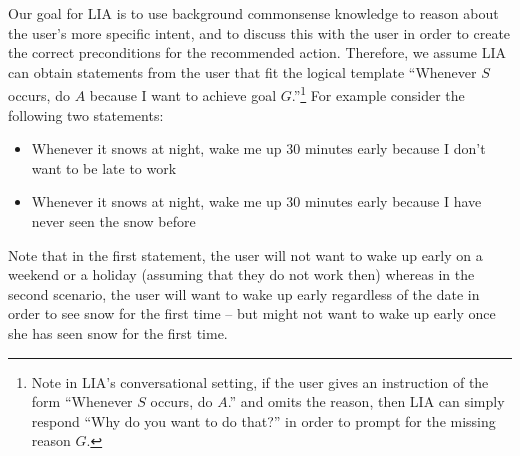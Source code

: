 Our goal for LIA is to use background commonsense knowledge to reason about the user's more specific intent, and to discuss this with the user in order to create the correct preconditions for the recommended action.  Therefore, we assume LIA can obtain statements from the user that fit the logical template ``Whenever $S$ occurs, do $A$ because I want to achieve goal $G$.''\footnote{Note in LIA's conversational setting, if the user gives an instruction of the form ``Whenever $S$ occurs, do $A$.'' and omits the reason, then LIA can simply respond ``Why do you want to do that?'' in order to prompt for the missing reason $G$.}
For example consider the following two statements: %
\begin{itemize}
\item Whenever it snows at night, wake me up 30 minutes early because I don't want to be late to work
\item Whenever it snows at night, wake me up 30 minutes early because I have never seen the snow before 
\end{itemize}
Note that in the first statement, the user will not want to wake up early on a weekend or a holiday (assuming that they do not work then) whereas in the second scenario, the user will want to wake up early regardless of the date in order to see snow for the first time -- but might not want to wake up early once she has seen snow for the first time.

